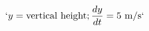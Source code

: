 \documentclass[preview]{standalone}
\begin{document}
\begin{align*}
`y = \text{vertical height}; \frac{dy}{dt} = 5 \text{ m/s}`
\end{align*}
\end{document}
